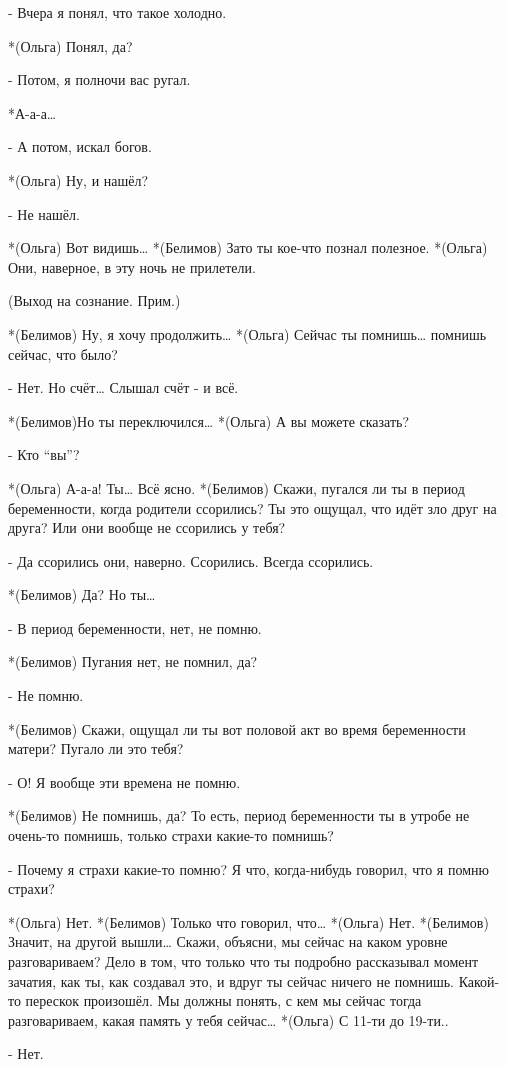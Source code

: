 - Вчера я понял, что такое холодно.

*(Ольга) Понял, да?

- Потом, я полночи вас ругал.

*А-а-а…

- А потом, искал богов.

*(Ольга) Ну, и нашёл?

- Не нашёл.

*(Ольга) Вот видишь…
*(Белимов) Зато ты кое-что познал полезное.
*(Ольга) Они, наверное, в эту ночь не прилетели.

(Выход на сознание. Прим.)

*(Белимов) Ну, я хочу продолжить…
*(Ольга) Сейчас ты помнишь… помнишь сейчас, что было?

- Нет. Но счёт… Слышал счёт - и всё.

*(Белимов)Но ты переключился…
*(Ольга) А вы можете сказать?

- Кто “вы”?

*(Ольга) А-а-а! Ты… Всё ясно.
*(Белимов) Скажи, пугался ли ты в период беременности, когда родители ссорились? Ты это ощущал, что идёт зло друг на друга? Или они вообще не ссорились у тебя?

- Да ссорились они, наверно. Ссорились. Всегда ссорились.

*(Белимов) Да? Но ты…

- В период беременности, нет, не помню.

*(Белимов) Пугания нет, не помнил, да?

- Не помню.

*(Белимов) Скажи, ощущал ли ты вот половой акт во время беременности матери? Пугало ли это тебя?

- О! Я вообще эти времена не помню.

*(Белимов) Не помнишь, да? То есть, период беременности ты в утробе не очень-то помнишь, только страхи какие-то помнишь?

- Почему я страхи какие-то помню? Я что, когда-нибудь говорил, что я помню страхи?

*(Ольга) Нет.
*(Белимов) Только что говорил, что…
*(Ольга) Нет.
*(Белимов) Значит, на другой вышли… Скажи, объясни, мы сейчас на каком уровне разговариваем? Дело в том, что только что ты подробно рассказывал момент зачатия, как ты, как создавал это, и вдруг ты сейчас ничего не помнишь. Какой-то перескок произошёл. Мы должны понять, с кем мы сейчас тогда разговариваем, какая память у тебя сейчас…
*(Ольга) С 11-ти до 19-ти..

- Нет.

